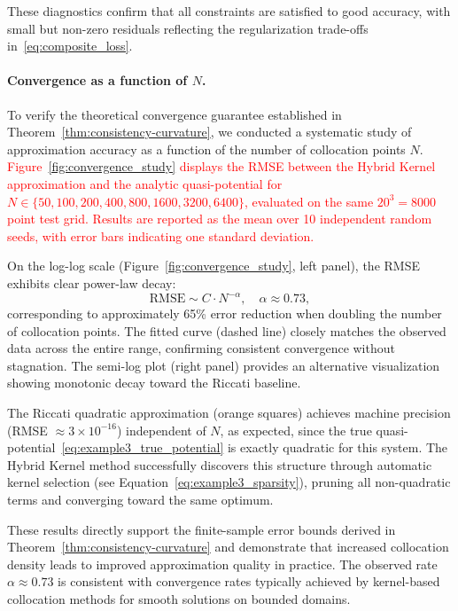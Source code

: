 \documentclass[11pt]{article}
\theoremstyle{plain}      %
\theoremstyle{definition} %
\begin{document}
These diagnostics confirm that all constraints are satisfied to good accuracy, 
with small but non-zero residuals reflecting the regularization trade-offs 
in~\eqref{eq:composite_loss}.


\paragraph{Convergence as a function of $N$.}
To verify the theoretical convergence guarantee established in 
Theorem~\ref{thm:consistency-curvature}, we conducted a systematic study of approximation 
accuracy as a function of the number of collocation points $N$. 
\textcolor{red}{Figure~\ref{fig:convergence_study} displays the RMSE between the Hybrid Kernel 
approximation and the analytic quasi-potential for $N \in \{50, 100, 200, 400, 800, 1600, 3200, 6400\}$, 
evaluated on the same $20^3 = 8000$ point test grid. Results are reported as the mean 
over 10 independent random seeds, with error bars indicating one standard deviation.}

On the log-log scale (Figure~\ref{fig:convergence_study}, left panel), the RMSE 
exhibits clear power-law decay:
\begin{equation}\label{eq:convergence_rate}
\text{RMSE} \sim C \cdot N^{-\alpha}, \quad \alpha \approx 0.73,
\end{equation}
corresponding to approximately 65\% error reduction when doubling the number of 
collocation points. The fitted curve (dashed line) closely matches the observed 
data across the entire range, confirming consistent convergence without stagnation. 
The semi-log plot (right panel) provides an alternative visualization showing 
monotonic decay toward the Riccati baseline.

The Riccati quadratic approximation (orange squares) achieves machine precision 
(RMSE $\approx 3 \times 10^{-16}$) independent of $N$, as expected, since the 
true quasi-potential~\eqref{eq:example3_true_potential} is exactly quadratic for 
this system. The Hybrid Kernel method successfully discovers this structure 
through automatic kernel selection (see Equation~\eqref{eq:example3_sparsity}), 
pruning all non-quadratic terms and converging toward the same optimum.

These results directly support the finite-sample error bounds derived in 
Theorem~\ref{thm:consistency-curvature} and demonstrate that increased collocation density 
leads to improved approximation quality in practice. The observed rate 
$\alpha \approx 0.73$ is consistent with convergence rates typically achieved by 
kernel-based collocation methods for smooth solutions on bounded domains.
\end{document}
